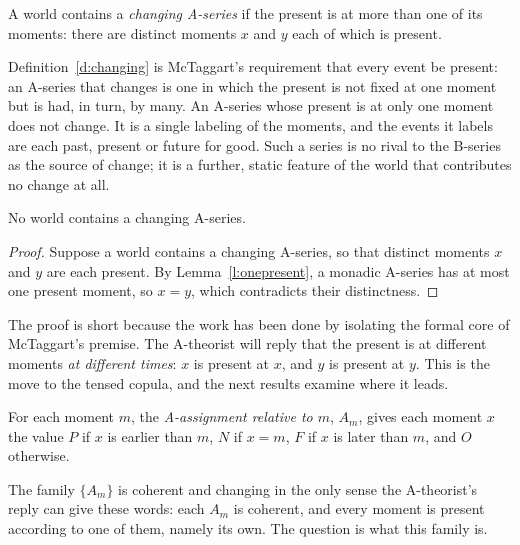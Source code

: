 \documentclass{situationist-preprint}
\begin{document}
\begin{definition}\label{d:changing}
A world contains a \emph{changing A-series} if the present is at more than one of its moments: there are distinct moments $x$ and $y$ each of which is present.
\end{definition}

Definition~\ref{d:changing} is McTaggart's requirement that every event be present: an A-series that changes is one in which the present is not fixed at one moment but is had, in turn, by many. An A-series whose present is at only one moment does not change. It is a single labeling of the moments, and the events it labels are each past, present or future for good. Such a series is no rival to the B-series as the source of change; it is a further, static feature of the world that contributes no change at all.

\begin{theorem}\label{t:nochange}
No world contains a changing A-series.
\end{theorem}

\begin{proof}
Suppose a world contains a changing A-series, so that distinct moments $x$ and $y$ are each present. By Lemma~\ref{l:onepresent}, a monadic A-series has at most one present moment, so $x = y$, which contradicts their distinctness.
\end{proof}

The proof is short because the work has been done by isolating the formal core of McTaggart's premise. The A-theorist will reply that the present is at different moments \emph{at different times}: $x$ is present at $x$, and $y$ is present at $y$. This is the move to the tensed copula, and the next results examine where it leads.

\begin{definition}\label{d:relative}
For each moment $m$, the \emph{A-assignment relative to $m$}, $A_m$, gives each moment $x$ the value $P$ if $x$ is earlier than $m$, $N$ if $x = m$, $F$ if $x$ is later than $m$, and $O$ otherwise.
\end{definition}

The family $\{A_m\}$ is coherent and changing in the only sense the A-theorist's reply can give these words: each $A_m$ is coherent, and every moment is present according to one of them, namely its own. The question is what this family is.
\end{document}
